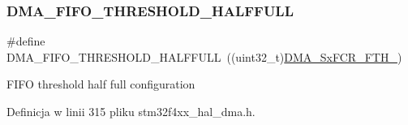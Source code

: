 \subsubsection{\texorpdfstring{D\+M\+A\+\_\+\+F\+I\+F\+O\+\_\+\+T\+H\+R\+E\+S\+H\+O\+L\+D\+\_\+\+H\+A\+L\+F\+F\+U\+LL}{DMA\_FIFO\_THRESHOLD\_HALFFULL}}
{\footnotesize\ttfamily \#define D\+M\+A\+\_\+\+F\+I\+F\+O\+\_\+\+T\+H\+R\+E\+S\+H\+O\+L\+D\+\_\+\+H\+A\+L\+F\+F\+U\+LL~((uint32\+\_\+t)\hyperlink{group___peripheral___registers___bits___definition_ga63716e11d34bca95927671055aa63fe8}{D\+M\+A\+\_\+\+Sx\+F\+C\+R\+\_\+\+F\+T\+H\+\_})}

F\+I\+FO threshold half full configuration 

Definicja w linii 315 pliku stm32f4xx\+\_\+hal\+\_\+dma.\+h.

